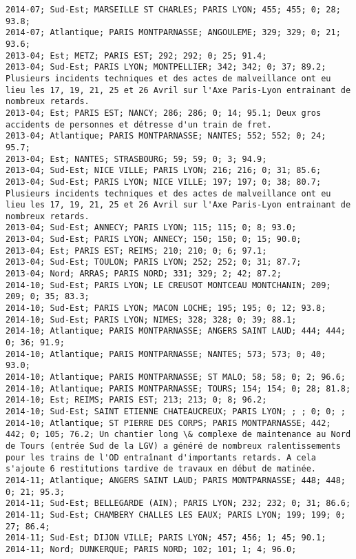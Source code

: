 \documentclass{article}
\begin{document}
\begin{Verbatim}[commandchars=\\\{\}]
2014-07; Sud-Est; MARSEILLE ST CHARLES; PARIS LYON; 455; 455; 0; 28; 93.8; 
2014-07; Atlantique; PARIS MONTPARNASSE; ANGOULEME; 329; 329; 0; 21; 93.6; 
2013-04; Est; METZ; PARIS EST; 292; 292; 0; 25; 91.4; 
2013-04; Sud-Est; PARIS LYON; MONTPELLIER; 342; 342; 0; 37; 89.2; Plusieurs incidents techniques et des actes de malveillance ont eu lieu les 17, 19, 21, 25 et 26 Avril sur l'Axe Paris-Lyon entrainant de nombreux retards.
2013-04; Est; PARIS EST; NANCY; 286; 286; 0; 14; 95.1; Deux gros accidents de personnes et détresse d'un train de fret.
2013-04; Atlantique; PARIS MONTPARNASSE; NANTES; 552; 552; 0; 24; 95.7; 
2013-04; Est; NANTES; STRASBOURG; 59; 59; 0; 3; 94.9; 
2013-04; Sud-Est; NICE VILLE; PARIS LYON; 216; 216; 0; 31; 85.6; 
2013-04; Sud-Est; PARIS LYON; NICE VILLE; 197; 197; 0; 38; 80.7; Plusieurs incidents techniques et des actes de malveillance ont eu lieu les 17, 19, 21, 25 et 26 Avril sur l'Axe Paris-Lyon entrainant de nombreux retards.
2013-04; Sud-Est; ANNECY; PARIS LYON; 115; 115; 0; 8; 93.0; 
2013-04; Sud-Est; PARIS LYON; ANNECY; 150; 150; 0; 15; 90.0; 
2013-04; Est; PARIS EST; REIMS; 210; 210; 0; 6; 97.1; 
2013-04; Sud-Est; TOULON; PARIS LYON; 252; 252; 0; 31; 87.7; 
2013-04; Nord; ARRAS; PARIS NORD; 331; 329; 2; 42; 87.2; 
2014-10; Sud-Est; PARIS LYON; LE CREUSOT MONTCEAU MONTCHANIN; 209; 209; 0; 35; 83.3; 
2014-10; Sud-Est; PARIS LYON; MACON LOCHE; 195; 195; 0; 12; 93.8; 
2014-10; Sud-Est; PARIS LYON; NIMES; 328; 328; 0; 39; 88.1; 
2014-10; Atlantique; PARIS MONTPARNASSE; ANGERS SAINT LAUD; 444; 444; 0; 36; 91.9; 
2014-10; Atlantique; PARIS MONTPARNASSE; NANTES; 573; 573; 0; 40; 93.0; 
2014-10; Atlantique; PARIS MONTPARNASSE; ST MALO; 58; 58; 0; 2; 96.6; 
2014-10; Atlantique; PARIS MONTPARNASSE; TOURS; 154; 154; 0; 28; 81.8; 
2014-10; Est; REIMS; PARIS EST; 213; 213; 0; 8; 96.2; 
2014-10; Sud-Est; SAINT ETIENNE CHATEAUCREUX; PARIS LYON; ; ; 0; 0; ; 
2014-10; Atlantique; ST PIERRE DES CORPS; PARIS MONTPARNASSE; 442; 442; 0; 105; 76.2; Un chantier long \& complexe de maintenance au Nord de Tours (entrée Sud de la LGV) a généré de nombreux ralentissements pour les trains de l'OD entraînant d'importants retards. A cela s'ajoute 6 restitutions tardive de travaux en début de matinée.
2014-11; Atlantique; ANGERS SAINT LAUD; PARIS MONTPARNASSE; 448; 448; 0; 21; 95.3; 
2014-11; Sud-Est; BELLEGARDE (AIN); PARIS LYON; 232; 232; 0; 31; 86.6; 
2014-11; Sud-Est; CHAMBERY CHALLES LES EAUX; PARIS LYON; 199; 199; 0; 27; 86.4; 
2014-11; Sud-Est; DIJON VILLE; PARIS LYON; 457; 456; 1; 45; 90.1; 
2014-11; Nord; DUNKERQUE; PARIS NORD; 102; 101; 1; 4; 96.0; 

\end{Verbatim}
\end{document}

